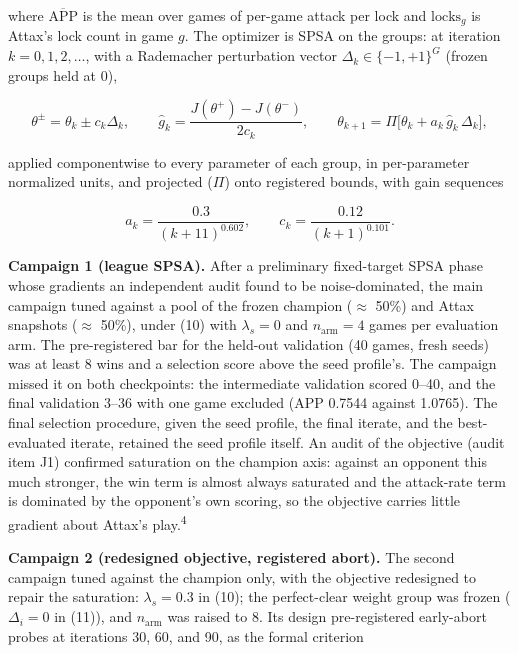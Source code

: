 \documentclass[
  11pt,
]{article}
\begin{document}
where \(\overline{\mathrm{APP}}\) is the mean over games of per-game
attack per lock and \(\mathrm{locks}_g\) is Attax's lock count in game
\(g\). The optimizer is SPSA on the groups: at iteration
\(k = 0, 1, 2, \dots\), with a Rademacher perturbation vector
\(\Delta_k \in \{-1, +1\}^G\) (frozen groups held at 0),

\begin{equation}\theta^{\pm} = \theta_k \pm c_k \Delta_k, \qquad \hat g_k = \frac{J(\theta^{+}) - J(\theta^{-})}{2 c_k}, \qquad \theta_{k+1} = \Pi\big[\theta_k + a_k \, \hat g_k \, \Delta_k\big],
\end{equation}

applied componentwise to every parameter of each group, in per-parameter
normalized units, and projected (\(\Pi\)) onto registered bounds, with
gain sequences

\begin{equation}a_k = \frac{0.3}{(k + 11)^{0.602}}, \qquad c_k = \frac{0.12}{(k + 1)^{0.101}}.
\end{equation}

\textbf{Campaign 1 (league SPSA).} After a preliminary fixed-target SPSA
phase whose gradients an independent audit found to be noise-dominated,
the main campaign tuned against a pool of the frozen champion (\(\approx\) 50\%)
and Attax snapshots (\(\approx\) 50\%), under (10) with \(\lambda_s = 0\) and
\(n_{\mathrm{arm}} =
4\) games per evaluation arm. The pre-registered bar for the held-out
validation (40 games, fresh seeds) was at least 8 wins and a selection
score above the seed profile's. The campaign missed it on both
checkpoints: the intermediate validation scored 0--40, and the final
validation 3--36 with one game excluded (APP 0.7544 against 1.0765). The
final selection procedure, given the seed profile, the final iterate,
and the best-evaluated iterate, retained the seed profile itself. An
audit of the objective (audit item J1) confirmed saturation on the
champion axis: against an opponent this much stronger, the win term is
almost always saturated and the attack-rate term is dominated by the
opponent's own scoring, so the objective carries little gradient about
Attax's play.\textsuperscript{4}

\textbf{Campaign 2 (redesigned objective, registered abort).} The second
campaign tuned against the champion only, with the objective redesigned
to repair the saturation: \(\lambda_s = 0.3\) in (10); the perfect-clear
weight group was frozen (\(\Delta_i = 0\) in (11)), and
\(n_{\mathrm{arm}}\) was raised to 8. Its design pre-registered
early-abort probes at iterations 30, 60, and 90, as the formal criterion
\end{document}
